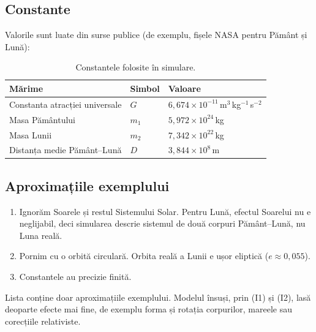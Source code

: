 \documentclass[11pt,a4paper]{article}
\begin{document}
\subsection*{Constante}
Valorile sunt luate din surse publice (de exemplu, fișele NASA pentru Pământ și Lună):

\begin{table}[H]
\centering
\begin{tabular}{@{}lll@{}}
\toprule
Mărime & Simbol & Valoare \\
\midrule
Constanta atracției universale & $G$ & $6{,}674\times10^{-11}$\,m$^3$\,kg$^{-1}$\,s$^{-2}$ \\
Masa Pământului & $m_1$ & $5{,}972\times10^{24}$\,kg \\
Masa Lunii & $m_2$ & $7{,}342\times10^{22}$\,kg \\
Distanța medie Pământ--Lună & $D$ & $3{,}844\times10^{8}$\,m \\
\bottomrule
\end{tabular}
\caption{Constantele folosite în simulare.}
\label{tab:const}
\end{table}

\subsection*{Aproximațiile exemplului}
\begin{enumerate}[label=(A\arabic*)]
  \item Ignorăm Soarele și restul Sistemului Solar. Pentru Lună, efectul Soarelui nu e neglijabil, deci simularea descrie sistemul de două corpuri Pământ--Lună, nu Luna reală.
  \item Pornim cu o orbită circulară. Orbita reală a Lunii e ușor eliptică ($e \approx 0{,}055$).
  \item Constantele au precizie finită.
\end{enumerate}
Lista conține doar aproximațiile exemplului. Modelul însuși, prin (I1) și (I2), lasă deoparte efecte mai fine, de exemplu forma și rotația corpurilor, mareele sau corecțiile relativiste.
\end{document}

